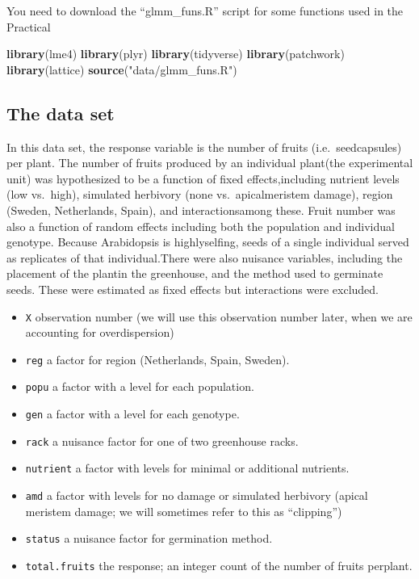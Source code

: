 \documentclass[
  12pt,
]{book}
\newenvironment{Shaded}{\begin{snugshade}}{\end{snugshade}}
\newcommand{\KeywordTok}[1]{\textcolor[rgb]{0.13,0.29,0.53}{\textbf{#1}}}
\newcommand{\NormalTok}[1]{#1}
\newcommand{\StringTok}[1]{\textcolor[rgb]{0.31,0.60,0.02}{#1}}
\providecommand{\tightlist}{%
  \setlength{\itemsep}{0pt}\setlength{\parskip}{0pt}}
\begin{document}
You need to download the ``glmm\_funs.R'' script for some functions used in the Practical

\begin{Shaded}
\begin{Highlighting}[]
\KeywordTok{library}\NormalTok{(lme4)}
\KeywordTok{library}\NormalTok{(plyr)}
\KeywordTok{library}\NormalTok{(tidyverse)}
\KeywordTok{library}\NormalTok{(patchwork)}
\KeywordTok{library}\NormalTok{(lattice)}
\KeywordTok{source}\NormalTok{(}\StringTok{"data/glmm_funs.R"}\NormalTok{)}
\end{Highlighting}
\end{Shaded}

\hypertarget{the-data-set}{%
\subsection{The data set}\label{the-data-set}}

In this data set, the response variable is the number of fruits (i.e.~seedcapsules) per plant. The number of fruits produced by an individual plant(the experimental unit) was hypothesized to be a function of fixed effects,including nutrient levels (low vs.~high), simulated herbivory (none vs.~apicalmeristem damage), region (Sweden, Netherlands, Spain), and interactionsamong these. Fruit number was also a function of random effects including both the population and individual genotype. Because Arabidopsis is highlyselfing, seeds of a single individual served as replicates of that individual.There were also nuisance variables, including the placement of the plantin the greenhouse, and the method used to germinate seeds. These were estimated as fixed effects but interactions were excluded.

\begin{itemize}
\tightlist
\item
  \texttt{X} observation number (we will use this observation number later, when we are accounting for overdispersion)
\item
  \texttt{reg} a factor for region (Netherlands, Spain, Sweden).
\item
  \texttt{popu} a factor with a level for each population.
\item
  \texttt{gen} a factor with a level for each genotype.
\item
  \texttt{rack} a nuisance factor for one of two greenhouse racks.
\item
  \texttt{nutrient} a factor with levels for minimal or additional nutrients.
\item
  \texttt{amd} a factor with levels for no damage or simulated herbivory (apical meristem damage; we will sometimes refer to this as ``clipping'')
\item
  \texttt{status} a nuisance factor for germination method.
\item
  \texttt{total.fruits} the response; an integer count of the number of fruits perplant.
\end{itemize}
\end{document}
